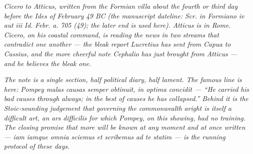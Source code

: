 
\textit{Cicero to Atticus, written from the Formian
villa about the fourth or third day before the Ides of
February 49 BC (the manuscript dateline: \textit{Scr.
in Formiano iv aut iii Id. Febr. a. 705 (49)}; the
later end is used here). Atticus is in Rome. Cicero,
on his coastal command, is reading the news in two
streams that contradict one another --- the bleak
report Lucretius has sent from Capua to Cassius, and
the more cheerful note Cephalio has just brought from
Atticus --- and he believes the bleak one.}

\textit{The note is a single section, half political
diary, half lament. The famous line is here: Pompey
\textit{malas causas semper obtinuit, in optima
concidit} --- ``He carried his bad causes through
always; in the best of causes he has collapsed.''
Behind it is the Stoic-sounding judgement that
governing the commonwealth aright is itself a difficult
art, an \textit{ars difficilis} for which Pompey, on
this showing, had no training. The closing promise
that more will be known at any moment and at once
written --- \textit{iam iamque omnia sciemus et
scribemus ad te statim} --- is the running protocol of
these days.}

